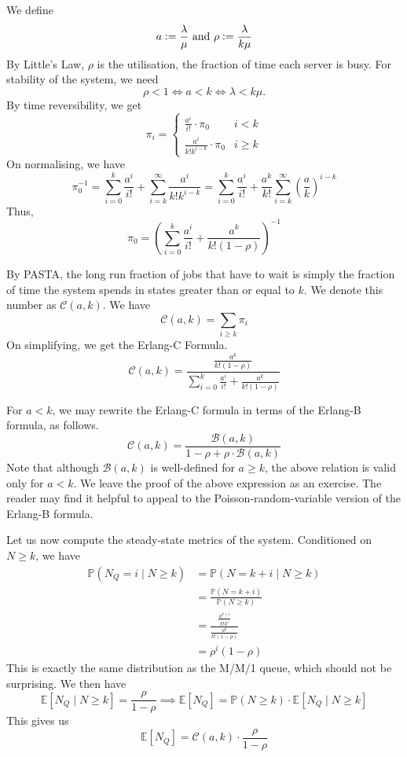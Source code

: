 \documentclass[12pt]{article}
\def\P{\mathbb{P}}
\def\E{\mathbb{E}}
\def\ddfrac#1#2{\displaystyle\frac{\displaystyle #1}{\displaystyle #2}}
\theoremstyle{definition}
\begin{document}
We define 
\[
    a \vcentcolon= \frac{\lambda}{\mu} \text{ and } \rho \vcentcolon= \frac{\lambda}{k\mu}
\]
By Little's Law, $\rho$ is the utilisation, the fraction of time each server is busy. For stability of the system, we need
\[
    \rho < 1 \iff a < k \iff \lambda < k\mu.
\]By time reversibility, we get
\[
    \pi_i = \begin{cases}
        \frac{a^i}{i!} \cdot \pi_0 & i < k \\
        \frac{a^i}{k! k^{i-k}} \cdot \pi_0 & i \geq k
    \end{cases}
\]
On normalising, we have
\[
    \pi_0^{-1} = \sum_{i=0}^k \frac{a^i}{i!} + \sum_{i=k}^{\infty} \frac{a^i}{k!k^{i-k}} = \sum_{i=0}^k \frac{a^i}{i!} + \frac{a^k}{k!} \sum_{i=k}^{\infty} \left( \frac{a}{k} \right)^{i-k}
\]
Thus,
\[
    \pi_0 = \left( \sum_{i=0}^k \frac{a^i}{i!} + \frac{a^k}{k!(1-\rho)} \right)^{-1}
\]

By PASTA, the long run fraction of jobs that have to wait is simply the fraction of time the system spends in states greater than or equal to $k$. We denote this number as $\mathcal{C}(a,k)$. We have
\[
    \mathcal{C}(a,k) = \sum_{i\geq k} \pi_i
\]
On simplifying, we get the Erlang-C Formula.
\[
    \boxed{\mathcal{C}(a,k) = \ddfrac{\frac{a^k}{k!(1-\rho)}}{\sum_{i=0}^k \frac{a^i}{i!} + \frac{a^k}{k!(1-\rho)}}}
\]

For $a < k$, we may rewrite the Erlang-C formula in terms of the Erlang-B formula, as follows.
\[
    \mathcal{C}(a,k) = \frac{\mathcal{B}(a,k)}{1-\rho + \rho\cdot\mathcal{B}(a,k)}
\]
Note that although $\mathcal{B}(a,k)$ is well-defined for $a \geq k$, the above relation is valid only for $a < k$. We leave the proof of the above expression as an exercise. The reader may find it helpful to appeal to the Poisson-random-variable version of the Erlang-B formula.

Let us now compute the steady-state metrics of the system. Conditioned on $N \geq k$, we have
\begin{align*}
    \P(N_Q = i \mid N \geq k) &= \P(N = k+i \mid N \geq k) \\
    &= \frac{\P(N=k+i)}{\P(N\geq k)} \\
    &= \ddfrac{\frac{a^{k+i}}{k!k^i}}{\frac{a^k}{k!(1-\rho)}} \\
    &= \rho^i (1-\rho)
\end{align*}
This is exactly the same distribution as the M/M/1 queue, which should not be surprising. We then have
\[
    \E[N_Q \mid N \geq k] = \frac{\rho}{1-\rho} \implies \E[N_Q] = \P(N \geq k) \cdot \E[N_Q \mid N \geq k]
\]
This gives us
\[
    \E[N_Q] = \mathcal{C}(a,k) \cdot \frac{\rho}{1-\rho}
\]
    
\end{document}
